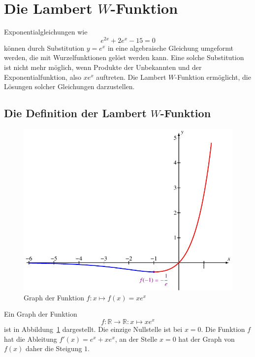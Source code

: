 %
%
%
\section{Die Lambert $W$-Funktion
\label{buch:section:lambertw}}
Exponentialgleichungen wie
\[
e^{2x}+2e^x-15=0
\]
können durch Substitution $y=e^x$ in eine algebraische Gleichung
umgeformt werden, die mit Wurzelfunktionen gelöst werden kann.
Eine solche Substitution ist nicht mehr möglich, wenn Produkte
der Unbekannten und der Exponentialfunktion, also $xe^x$ auftreten.
Die Lambert $W$-Funktion ermöglicht, die Lösungen solcher Gleichungen
darzustellen.

%
%
\subsection{Die Definition der Lambert $W$-Funktion
\label{buch:subsection:funktion-xexpx}}
\begin{figure}
\centering
\includegraphics{chapters/020-exponential/images/xexpx.pdf}
\caption{Graph der Funktion $f\colon x\mapsto f(x)=xe^x$
\label{buch:lambert:graph}}
\end{figure}
Ein Graph der Funktion 
\[
f\colon \mathbb{R}\to\mathbb{R} : x\mapsto xe^x
\]
ist in Abbildung~\ref{buch:lambert:graph} dargestellt.
Die einzige Nullstelle ist bei $x=0$.
Die Funktion $f$ hat die Ableitung
$f'(x)=e^x + xe^x$,
an  der Stelle $x=0$ hat der Graph von $f(x)$ daher die Steigung $1$.

